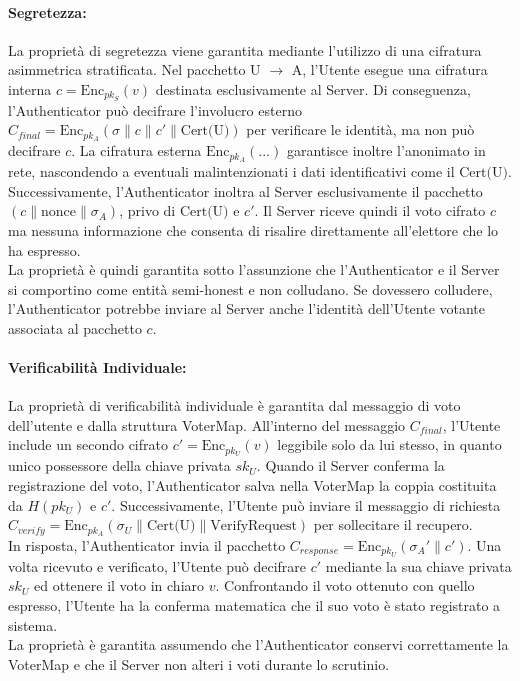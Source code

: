 \paragraph{Segretezza:}
La proprietà di segretezza viene garantita mediante l'utilizzo di una cifratura asimmetrica stratificata. Nel pacchetto U $\rightarrow$ A, l'Utente esegue una cifratura interna $c = \text{Enc}_{pk_S}(v)$ destinata esclusivamente al Server. Di conseguenza, l'Authenticator può decifrare l'involucro esterno $C_{final} = \text{Enc}_{pk_A}(\sigma \| c \| c' \| \text{Cert(U)})$ per verificare le identità, ma non può decifrare $c$. La cifratura esterna $\text{Enc}_{pk_A}(...)$ garantisce inoltre l'anonimato in rete, nascondendo a eventuali malintenzionati i dati identificativi come il $\text{Cert(U)}$. \\
Successivamente, l'Authenticator inoltra al Server esclusivamente il pacchetto $(c \| \text{nonce} \| \sigma_A)$, privo di $\text{Cert(U)}$ e $c'$. Il Server riceve quindi il voto cifrato $c$ ma nessuna informazione che consenta di risalire direttamente all'elettore che lo ha espresso. \\
La proprietà è quindi garantita sotto l'assunzione che l'Authenticator e il Server si comportino come entità semi-honest e non colludano. Se dovessero colludere, l'Authenticator potrebbe inviare al Server anche l'identità dell'Utente votante associata al pacchetto $c$.

\paragraph{Verificabilità Individuale:}
La proprietà di verificabilità individuale è garantita dal messaggio di voto dell'utente e dalla struttura VoterMap. All'interno del messaggio $C_{final}$, l'Utente include un secondo cifrato $c' = \text{Enc}_{pk_U}(v)$ leggibile solo da lui stesso, in quanto unico possessore della chiave privata $sk_U$. Quando il Server conferma la registrazione del voto, l'Authenticator salva nella VoterMap la coppia costituita da $H(pk_U)$ e $c'$. Successivamente, l'Utente può inviare il messaggio di richiesta $C_{verify} = \text{Enc}_{pk_A}(\sigma_U \| \text{Cert(U)} \| \text{VerifyRequest})$ per sollecitare il recupero. \\
In risposta, l'Authenticator invia il pacchetto $C_{response} = \text{Enc}_{pk_U}(\sigma_A' \| c')$. Una volta ricevuto e verificato, l'Utente può decifrare $c'$ mediante la sua chiave privata $sk_U$ ed ottenere il voto in chiaro $v$. Confrontando il voto ottenuto con quello espresso, l'Utente ha la conferma matematica che il suo voto è stato registrato a sistema. \\
La proprietà è garantita assumendo che l'Authenticator conservi correttamente la VoterMap e che il Server non alteri i voti durante lo scrutinio.

